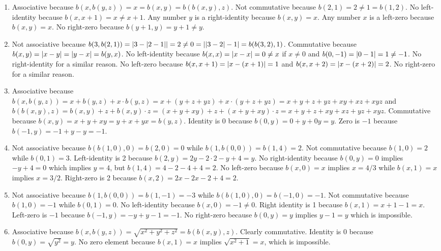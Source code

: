 \begin{solution}
\begin{enumerate}[label=(\alph*)]
    \item Associative because $b(x,b(y,z))=x=b(x,y)=b(b(x,y),z)$.
    Not commutative because $b(2,1)=2\neq 1=b(1,2)$.
    No left-identity because $b(x,x+1)=x\neq x+1$.
    Any number $y$ is a right-identity because $b(x,y)=x$.
    Any number $x$ is a left-zero because $b(x,y)=x$.
    No right-zero because $b(y+1,y)=y+1\neq y$.

    \item Not associative because $b(3,b(2,1)) = \left\lvert3-\left\lvert2-1\right\rvert\right\rvert=2\neq0=\left\lvert\left\lvert3-2\right\rvert-1\right\rvert=b(b(3,2),1)$.
    Commutative because $b(x,y)=\left\lvert x-y\right\rvert=\left\lvert y-x\right\rvert=b(y,x)$.
    No left-identity because $b(x,x)=\left\lvert x-x\right\rvert=0\neq x$ if $x\neq 0$ and $b(0,-1)=\left\lvert0-1\right\rvert=1\neq -1$.
    No right-identity for a similar reason.
    No left-zero because $b(x,x+1)=\left\lvert x-(x+1)\right\rvert=1$ and $b(x,x+2)=\left\lvert x-(x+2)\right\rvert=2$.
    No right-zero for a similar reason.

    \item Associative because $b(x,b(y,z))=x+b(y,z)+x\cdot b(y,z)=x+(y+z+yz)+x\cdot(y+z+yz)
    =x+y+z+yz+xy+xz+xyz$ and $b(b(x,y),z)=b(x,y) + z + b(x,y)\cdot z=(x+y+xy) + z + (x+y+xy)\cdot z
    =x + y + z + xy + xz + yz + xyz$.
    Commutative because $b(x,y)=x+y+xy=y+x+yx=b(y,z)$.
    Identity is 0 because $b(0,y)=0+y+0y=y$.
    Zero is $-1$ because $b(-1,y)=-1+y-y=-1$.

    \item Not associative because $b(b(1,0),0)=b(2,0)=0$ while $b(1,b(0,0))
    =b(1,4)=2$.
    Not commutative because $b(1,0)=2$ while $b(0,1)=3$.
    Left-identity is 2 because $b(2,y)=2y-2\cdot 2 - y + 4 = y$.
    No right-identity because $b(0,y)=0$ implies $-y+4=0$ which implies $y=4$, but $b(1,4)=4-2-4+4=2$.
    No left-zero because $b(x,0)=x$ implies $x=4/3$ while $b(x,1)=x$ implies $x=3/2$.
    Right-zero is 2 because $b(x,2)=2x-2x-2+4=2$.

    \item Not associative because $b(1,b(0,0))=b(1,-1)=-3$ while $b(b(1,0),0)=b(-1,0)=-1$.
    Not commutative because $b(1,0)=-1$ while $b(0,1)=0$.
    No left-identity because $b(x,0)=-1\neq 0$.
    Right identity is 1 because $b(x,1)=x+1-1=x$.
    Left-zero is $-1$ because $b(-1,y)=-y+y-1=-1$.
    No right-zero because $b(0,y)=y$ implies $y-1=y$ which is impossible.

    \item Associative because
    $b(x,b(y,z))=\sqrt{x^2+y^2+z^2}=b(b(x,y),z)$.
    Clearly commutative.
    Identity is 0 because $b(0,y)=\sqrt{y^2}=y$.
    No zero element because $b(x,1)=x$ implies $\sqrt{x^2+1}=x$, which is impossible.


\end{enumerate}
\end{solution}
